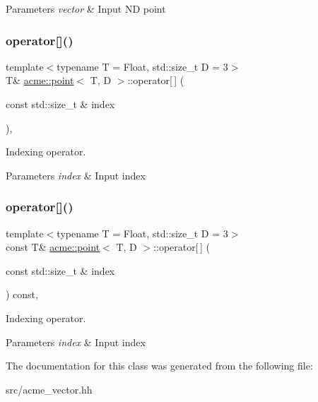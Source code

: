 \begin{DoxyParams}{Parameters}
{\em vector} & Input ND point \\
\hline
\end{DoxyParams}
\mbox{\label{classacme_1_1point_ac8fee17f41cb01f10ecb082921018155}} 
\subsubsection{\texorpdfstring{operator[]()}{operator[]()}\hspace{0.1cm}{\footnotesize\ttfamily [1/2]}}
{\footnotesize\ttfamily template$<$typename T = Float, std\+::size\+\_\+t D = 3$>$ \\
T\& \hyperlink{classacme_1_1point}{acme\+::point}$<$ T, D $>$\+::operator\mbox{[}$\,$\mbox{]} (\begin{DoxyParamCaption}\item[{const std\+::size\+\_\+t \&}]{index }\end{DoxyParamCaption})\hspace{0.3cm}{\ttfamily [inline]}, {\ttfamily [inherited]}}



Indexing operator. 


\begin{DoxyParams}{Parameters}
{\em index} & Input index \\
\hline
\end{DoxyParams}
\mbox{\label{classacme_1_1point_a5e3a5ca9538fcdb337127d27fcecc2b6}} 
\subsubsection{\texorpdfstring{operator[]()}{operator[]()}\hspace{0.1cm}{\footnotesize\ttfamily [2/2]}}
{\footnotesize\ttfamily template$<$typename T = Float, std\+::size\+\_\+t D = 3$>$ \\
const T\& \hyperlink{classacme_1_1point}{acme\+::point}$<$ T, D $>$\+::operator\mbox{[}$\,$\mbox{]} (\begin{DoxyParamCaption}\item[{const std\+::size\+\_\+t \&}]{index }\end{DoxyParamCaption}) const\hspace{0.3cm}{\ttfamily [inline]}, {\ttfamily [inherited]}}



Indexing operator. 


\begin{DoxyParams}{Parameters}
{\em index} & Input index \\
\hline
\end{DoxyParams}


The documentation for this class was generated from the following file\+:\begin{DoxyCompactItemize}
\item 
src/acme\+\_\+vector.\+hh\end{DoxyCompactItemize}
